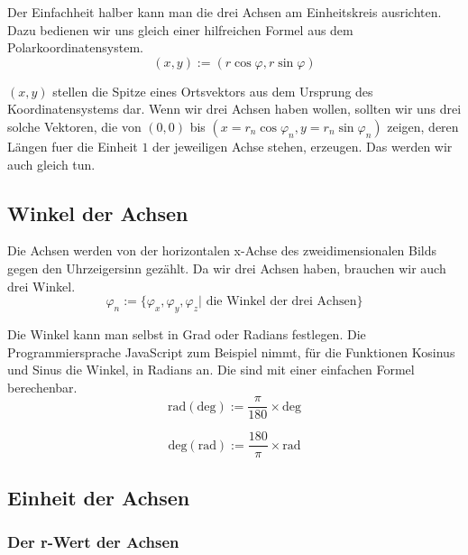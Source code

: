 \documentclass[a4paper]{article}
\begin{document}
Der Einfachheit halber kann man die drei Achsen am Einheitskreis ausrichten. Dazu bedienen wir uns gleich einer hilfreichen Formel aus dem Polarkoordinatensystem.\\

\begin{displaymath}
	(x,y) := (r \cos \varphi, r \sin \varphi)
\end{displaymath}

$(x,y)$ stellen die Spitze eines Ortsvektors aus dem Ursprung des Koordinatensystems dar. Wenn wir drei Achsen haben wollen, sollten wir uns drei solche Vektoren, die von $(0,0)$ bis $(x=r_n\cos\varphi_n,y=r_n\sin\varphi_n)$ zeigen, deren L\"angen fuer die Einheit $1$ der jeweiligen Achse stehen, erzeugen. Das werden wir auch gleich tun. \\


\subsection{Winkel der Achsen}

Die Achsen werden von der horizontalen x-Achse des zweidimensionalen Bilds gegen den Uhrzeigersinn gez\"ahlt. Da wir drei Achsen haben, brauchen wir auch drei Winkel.\\

\begin{displaymath}
	\varphi_n := \{ \varphi_x, \varphi_y, \varphi_z | \mbox{ die Winkel der drei Achsen}\}
\end{displaymath}

Die Winkel kann man selbst in Grad oder Radians festlegen. Die Programmiersprache JavaScript zum Beispiel nimmt, f\"ur die Funktionen Kosinus und Sinus die Winkel, in Radians an. Die sind mit einer einfachen Formel berechenbar.\\

\begin{displaymath}
	\mbox{rad}(\mbox{deg}) := \frac{\pi}{180} \times \mbox{deg}
\end{displaymath}

\begin{displaymath}
	\mbox{deg}(\mbox{rad}) := \frac{180}{\pi} \times \mbox{rad}
\end{displaymath}

\subsection{Einheit der Achsen}

\subsubsection{Der r-Wert der Achsen}
\end{document}
